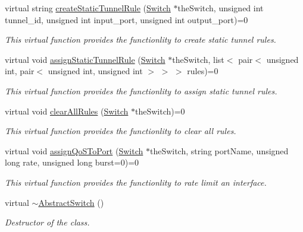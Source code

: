 \begin{DoxyCompactItemize}
virtual string \hyperlink{classAbstractSwitch_aeaf92eb83bda5739a16abf4b9b01dd03}{create\-Static\-Tunnel\-Rule} (\hyperlink{classSwitch}{\-Switch} $\ast$the\-Switch, unsigned int tunnel\-\_\-id, unsigned int input\-\_\-port, unsigned int output\-\_\-port)=0
\begin{DoxyCompactList}\small\item\em \-This virtual function provides the functionlity to create static tunnel rules. \end{DoxyCompactList}\item 
virtual void \hyperlink{classAbstractSwitch_a33a879779932e15f14a24794aa8ab08d}{assign\-Static\-Tunnel\-Rule} (\hyperlink{classSwitch}{\-Switch} $\ast$the\-Switch, list$<$ pair$<$ unsigned int, pair$<$ unsigned int, unsigned int $>$ $>$ $>$ rules)=0
\begin{DoxyCompactList}\small\item\em \-This virtual function provides the functionlity to assign static tunnel rules. \end{DoxyCompactList}\item 
virtual void \hyperlink{classAbstractSwitch_a724010e20fda542c12dbdca5c9eff36c}{clear\-All\-Rules} (\hyperlink{classSwitch}{\-Switch} $\ast$the\-Switch)=0
\begin{DoxyCompactList}\small\item\em \-This virtual function provides the functionlity to clear all rules. \end{DoxyCompactList}\item 
virtual void \hyperlink{classAbstractSwitch_aeaf721939e4b8a5708c7403d1d29e36c}{assign\-Qo\-S\-To\-Port} (\hyperlink{classSwitch}{\-Switch} $\ast$the\-Switch, string port\-Name, unsigned long rate, unsigned long burst=0)=0
\begin{DoxyCompactList}\small\item\em \-This virtual function provides the functionlity to rate limit an interface. \end{DoxyCompactList}\item 
\hypertarget{classAbstractSwitch_a9793e72a518d5c95c9a89dd14392c0a8}{virtual \hyperlink{classAbstractSwitch_a9793e72a518d5c95c9a89dd14392c0a8}{$\sim$\-Abstract\-Switch} ()}\label{classAbstractSwitch_a9793e72a518d5c95c9a89dd14392c0a8}

\begin{DoxyCompactList}\small\item\em \-Destructor of the class. \end{DoxyCompactList}\end{DoxyCompactItemize}
